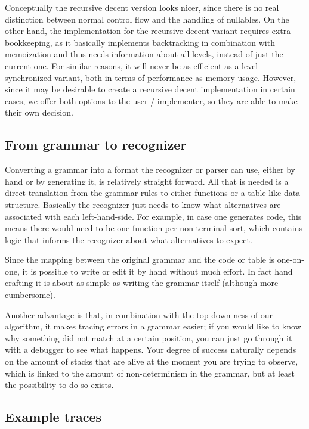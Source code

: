 \documentclass[a4paper,10pt]{article}
\begin{document}
Conceptually the recursive decent version looks nicer, since there is no real distinction between normal control flow and the handling of nullables. On the other hand, the implementation for the recursive decent variant requires extra bookkeeping, as it basically implements backtracking in combination with memoization and thus needs information about all levels, instead of just the current one. For similar reasons, it will never be as efficient as a level synchronized variant, both in terms of performance as memory usage. However, since it may be desirable to create a recursive decent implementation in certain cases, we offer both options to the user / implementer, so they are able to make their own decision.

\subsection{From grammar to recognizer}

Converting a grammar into a format the recognizer or parser can use, either by hand or by generating it, is relatively straight forward. All that is needed is a direct translation from the grammar rules to either functions or a table like data structure. Basically the recognizer just needs to know what alternatives are associated with each left-hand-side. For example, in case one generates code, this means there would need to be one function per non-terminal sort, which contains logic that informs the recognizer about what alternatives to expect.

Since the mapping between the original grammar and the code or table is one-on-one, it is possible to write or edit it by hand without much effort. In fact hand crafting it is about as simple as writing the grammar itself (although more cumbersome).

Another advantage is that, in combination with the top-down-ness of our algorithm, it makes tracing errors in a grammar easier; if you would like to know why something did not match at a certain position, you can just go through it with a debugger to see what happens. Your degree of success naturally depends on the amount of stacks that are alive at the moment you are trying to observe, which is linked to the amount of non-determinism in the grammar, but at least the possibility to do so exists.

\subsection{Example traces}
\end{document}
